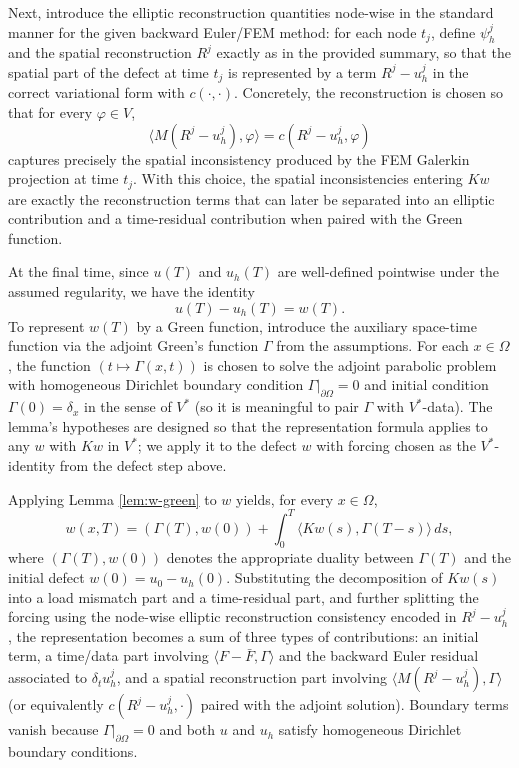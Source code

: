 \documentclass[11pt]{article}
\begin{document}
Next, introduce the elliptic reconstruction quantities node-wise in the standard manner for the given backward Euler/FEM method: for each node \(t_j\), define \(\psi_h^j\) and the spatial reconstruction \(R^j\) exactly as in the provided summary, so that the spatial part of the defect at time \(t_j\) is represented by a term \(R^j-u_h^j\) in the correct variational form with \(c(\cdot,\cdot)\). Concretely, the reconstruction is chosen so that for every \(\varphi\in V\),
\[
\langle M(R^j- u_h^j),\varphi\rangle=c(R^j- u_h^j,\varphi)
\]
captures precisely the spatial inconsistency produced by the FEM Galerkin projection at time \(t_j\). With this choice, the spatial inconsistencies entering \(Kw\) are exactly the reconstruction terms that can later be separated into an elliptic contribution and a time-residual contribution when paired with the Green function.

At the final time, since \(u(T)\) and \(u_h(T)\) are well-defined pointwise under the assumed regularity, we have the identity
\[
u(T)-u_h(T)=w(T).
\]
To represent \(w(T)\) by a Green function, introduce the auxiliary space-time function via the adjoint Green’s function \(\Gamma\) from the assumptions. For each \(x\in\Omega\), the function \((t\mapsto \Gamma(x,t))\) is chosen to solve the adjoint parabolic problem with homogeneous Dirichlet boundary condition \(\Gamma|_{\partial\Omega}=0\) and initial condition \(\Gamma(0)=\delta_x\) in the sense of \(V^*\) (so it is meaningful to pair \(\Gamma\) with \(V^*\)-data). The lemma’s hypotheses are designed so that the representation formula applies to any \(w\) with \(K w\) in \(V^*\); we apply it to the defect \(w\) with forcing chosen as the \(V^*\)-identity from the defect step above.

Applying Lemma \ref{lem:w-green} to \(w\) yields, for every \(x\in\Omega\),
\[
w(x,T)=(\Gamma(T),w(0))+\int_0^T\langle Kw(s),\Gamma(T-s)\rangle\,ds,
\]
where \((\Gamma(T),w(0))\) denotes the appropriate duality between \(\Gamma(T)\) and the initial defect \(w(0)=u_0-u_h(0)\). Substituting the decomposition of \(Kw(s)\) into a load mismatch part and a time-residual part, and further splitting the forcing using the node-wise elliptic reconstruction consistency encoded in \(R^j- u_h^j\), the representation becomes a sum of three types of contributions: an initial term, a time/data part involving \(\langle F-\bar F,\Gamma\rangle\) and the backward Euler residual associated to \(\delta_t u_h^j\), and a spatial reconstruction part involving \(\langle M(R^j-u_h^j),\Gamma\rangle\) (or equivalently \(c(R^j-u_h^j,\cdot)\) paired with the adjoint solution). Boundary terms vanish because \(\Gamma|_{\partial\Omega}=0\) and both \(u\) and \(u_h\) satisfy homogeneous Dirichlet boundary conditions.
\end{document}
